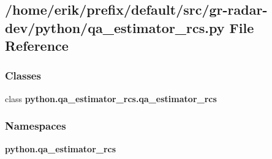 \subsection{/home/erik/prefix/default/src/gr-\/radar-\/dev/python/qa\+\_\+estimator\+\_\+rcs.py File Reference}
\label{qa__estimator__rcs_8py}
\subsubsection*{Classes}
\begin{DoxyCompactItemize}
\item 
class {\bf python.\+qa\+\_\+estimator\+\_\+rcs.\+qa\+\_\+estimator\+\_\+rcs}
\end{DoxyCompactItemize}
\subsubsection*{Namespaces}
\begin{DoxyCompactItemize}
\item 
 {\bf python.\+qa\+\_\+estimator\+\_\+rcs}
\end{DoxyCompactItemize}
